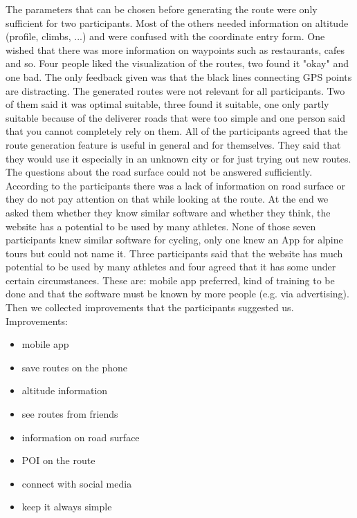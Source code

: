 \documentclass{sigchi}
\begin{document}
The parameters that can be chosen before generating the route were only sufficient for two participants. Most of the others needed information on altitude (profile, climbs, ...) and were confused with the coordinate entry form. One wished that there was more information on waypoints such as restaurants, cafes and so.
Four people liked the visualization of the routes, two found it "okay" and one bad. The only feedback given was that the black lines connecting GPS points are distracting.
The generated routes were not relevant for all participants. Two of them said it was optimal suitable, three found it suitable, one only partly suitable because of the deliverer roads that were too simple and one person said that you cannot completely rely on them.
All of the participants agreed that the route generation feature is useful in general and for themselves. They said that they would use it especially in an unknown city or for just trying out new routes.
The questions about the road surface could not be answered sufficiently. According to the participants there was a lack of information on road surface or they do not pay attention on that while looking at the route.
At the end we asked them whether they know similar software and whether they think, the website has a potential to be used by many athletes.
None of those seven participants knew similar software for cycling, only one knew an App for alpine tours but could not name it.
Three participants said that the website has much potential to be used by many athletes and four agreed that it has some under certain circumstances. These are: mobile app preferred, kind of training to be done and that the software must be known by more people (e.g. via advertising).
Then we collected improvements that the participants suggested us.
Improvements:
\begin{itemize}
\item mobile app
\item save routes on the phone
\item altitude information
\item see routes from friends
\item information on road surface
\item POI on the route
\item connect with social media
\item keep it always simple
\end{itemize}
\end{document}
